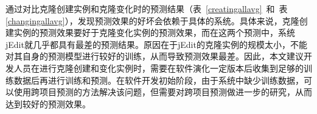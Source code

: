 
通过对比克隆创建实例和克隆变化时的预测结果（表~\ref{creatingallavg}~和~表\ref{changingallavg}），发现预测效果的好坏会依赖于具体的系统。具体来说，克隆创建实例的预测效果要好于克隆变化实例的预测效果，而在这两个预测中，系统jEdit就几乎都具有最差的预测结果。原因在于jEdit的克隆实例的规模太小，不能对其自身的预测模型进行较好的训练，从而导致预测效果最差。因此，本文建议开发人员在进行克隆创建和变化实例时，需要在软件演化一定版本后收集到足够的训练数据后再进行训练和预测。在软件开发初始阶段，由于系统中缺少训练数据，可以使用跨项目预测的方法解决该问题，但需要对跨项目预测做进一步的研究，从而达到较好的预测效果。


